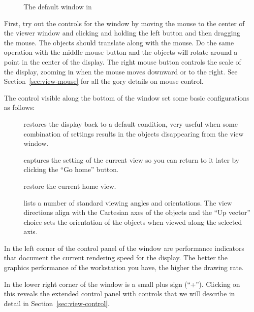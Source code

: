 \begin{figure}[htb]
  \begin{makeimage}
  \end{makeimage}
  \viewerwindow
  \caption{\label{fig:viewwindow} The default \viewer{} window in \SR{}}
\end{figure}


First, try out the controls for the \graphics{} window by moving the mouse
to the center of the viewer window and clicking and holding the left button
and then dragging the mouse.  The objects should translate along with the
mouse.  Do the same operation with the middle mouse button and the objects
will rotate around a point in the center of the display.  The right mouse
button controls the scale of the display, zooming in  when the mouse moves
downward or to the right.  See Section~\ref{sec:view-mouse} for all the
gory details on mouse control.

The control visible along the bottom of the \viewer{} window set some basic
configurations as follows:
%
\begin{description}
  \item [ ] restores the display back to a default
        condition, very useful when some combination of settings results in
        the objects disappearing from the view window.
  \item [ ] captures the setting of the current view
        so you 
        can return to it later by clicking the ``Go home'' button.
  \item [ ] restore the current home view.
  \item [ ] lists a number of standard viewing angles and
        orientations.  The view directions align with the Cartesian axes
        of the objects and the ``Up vector'' choice sets the orientation of
        the objects when viewed along the selected axis.
\end{description}

In the left corner of the control panel of the \viewer{} window are
performance indicators that document the current rendering speed for the
display.  The better the graphics performance of the workstation you
have, the higher the drawing rate.

In the lower right corner of the \viewer{} window is a small plus sign
(``+'').  Clicking on this reveals the extended control panel with controls
that we will describe in detail in Section~\ref{sec:view-control}.



